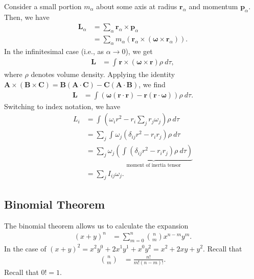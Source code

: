 \documentclass[10pt]{mypackage}
\begin{document}
\begin{example}
  Consider a small portion $m_{\alpha}$ about some axis at radius $\mathbf{r}_{\alpha}$ and momentum $\mathbf{p}_{\alpha}$. Then, we have
  \begin{align*}
    \mathbf{L}_{\alpha} &= \sum_{\alpha}\mathbf{r}_{\alpha}\times \mathbf{p}_{\alpha}\\
                        &= \sum_{\alpha}m_{\alpha}\left(\mathbf{r}_{\alpha}\times \left(\boldsymbol{\omega}\times \mathbf{r}_{\alpha}\right)\right).
  \end{align*}
  In the infinitesimal case (i.e., as $\alpha \rightarrow 0$), we get
  \begin{align*}
    \mathbf{L} &= \int_{}^{} \mathbf{r}\times \left(\boldsymbol{\omega}\times \mathbf{r}\right)\rho\:d\tau,
  \end{align*}
  where $\rho$ denotes volume density. Applying the identity $\mathbf{A}\times \left(\mathbf{B}\times \mathbf{C}\right) = \mathbf{B}\left(\mathbf{A}\cdot \mathbf{C}\right) - \mathbf{C}\left(\mathbf{A}\cdot \mathbf{B}\right)$, we find
  \begin{align*}
    \mathbf{L} &= \int\left(\boldsymbol{\omega}\left(\mathbf{r}\cdot \mathbf{r}\right) - \mathbf{r}\left(\mathbf{r}\cdot \boldsymbol{\omega}\right)\right)\rho\:d\tau.
  \end{align*}
  Switching to index notation, we have
  \begin{align*}
    L_i &= \int_{}^{} \left(\omega_ir^2 - r_i\sum_{j}r_j\omega_j\right)\rho\:d\tau\\
        &= \sum_{j}\int_{}^{} \omega_j\left(\delta_{ij}r^2 - r_ir_j\right)\rho\:d\tau\\
        &= \sum_{j}\omega_j\underbrace{\left(\int_{}^{} \left(\delta_{ij}r^2 - r_ir_j\right)\rho\:d\tau\right)}_{\text{moment of inertia tensor}}\\
        &= \sum_{j}I_{ij}\omega_j.
  \end{align*}
\end{example}
\subsection{Binomial Theorem}%
The binomial theorem allows us to calculate the expansion
\begin{align*}
  \left(x+y\right)^n &= \sum_{m=0}^{n}{n\choose m}x^{n-m}y^{m}.
\end{align*}
In the case of $\left(x + y\right)^2 = x^2y^{0} + 2x^{1}y^1 + x^{0}y^2 = x^2 + 2xy + y^2$. Recall that
\begin{align*}
  {n\choose m} &= \frac{n!}{m!\left(n-m\right)!}.
\end{align*}
Recall that $0! = 1$.
\end{document}
